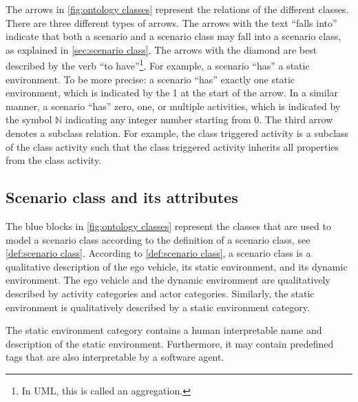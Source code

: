 The arrows in \cref{fig:ontology classes} represent the relations of the different classes. There are three different types of arrows. The arrows with the text ``falls into'' indicate that both a scenario and a scenario class may fall into a scenario class, as explained in \cref{sec:scenario class}. The arrows with the diamond are best described by the verb ``to have''\footnote{In UML, this is called an aggregation.}. For example, a scenario ``has'' a static environment. To be more precise: a scenario ``has'' exactly one static environment, which is indicated by the 1 at the start of the arrow. In a similar manner, a scenario ``has'' zero, one, or multiple activities, which is indicated by the symbol $\mathbb{N}$ indicating any integer number starting from 0. The third arrow denotes a subclass relation. For example, the class triggered activity is a subclass of the class activity such that the class triggered activity inherits all properties from the class activity.



\subsection{Scenario class and its attributes}
\label{sec:domain scenario class}

The blue blocks in \cref{fig:ontology classes} represent the classes that are used to model a scenario class according to the definition of a scenario class, see \cref{def:scenario class}. According to \cref{def:scenario class}, a scenario class is a qualitative description of the ego vehicle, its static environment, and its dynamic environment. The ego vehicle and the dynamic environment are qualitatively described by activity categories and actor categories. Similarly, the static environment is qualitatively described by a static environment category. 

The static environment category contains a human interpretable name and description of the static environment. Furthermore, it may contain predefined tags that are also interpretable by a software agent. 

